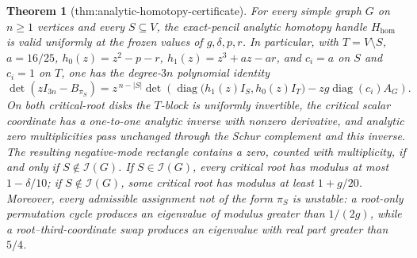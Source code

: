 \documentclass{article}
\newtheorem{theorem}{Theorem}
\begin{document}
\begin{theorem}[thm:analytic-homotopy-certificate]\label{thm:analytic-homotopy-certificate}
For every simple graph \(G\) on \(n\geq1\) vertices and every \(S\subseteq V\), the exact-pencil analytic homotopy handle \(H_{\mathrm{hom}}\) is valid uniformly at the frozen values of \(g,\delta,p,r\). In particular, with \(T=V\setminus S\), \(a=16/25\), \(h_0(z)=z^2-p-r\), \(h_1(z)=z^3+az-ar\), and \(c_i=a\) on \(S\) and \(c_i=1\) on \(T\), one has the degree-\(3n\) polynomial identity
\[
 \det(zI_{3n}-B_{\pi_S})
 =z^{\,n-|S|}
   \det\!\left(
     \operatorname{diag}\bigl(h_1(z)I_S,h_0(z)I_T\bigr)
     -zg\operatorname{diag}(c_i)A_G
   \right).
\]
On both critical-root disks the \(T\)-block is uniformly invertible, the critical scalar coordinate has a one-to-one analytic inverse with nonzero derivative, and analytic zero multiplicities pass unchanged through the Schur complement and this inverse. The resulting negative-mode rectangle contains a zero, counted with multiplicity, if and only if \(S\notin\mathcal I(G)\). If \(S\in\mathcal I(G)\), every critical root has modulus at most \(1-\delta/10\); if \(S\notin\mathcal I(G)\), some critical root has modulus at least \(1+g/20\). Moreover, every admissible assignment not of the form \(\pi_S\) is unstable: a root-only permutation cycle produces an eigenvalue of modulus greater than \(1/(2g)\), while a root--third-coordinate swap produces an eigenvalue with real part greater than \(5/4\).
\end{theorem}
\end{document}
